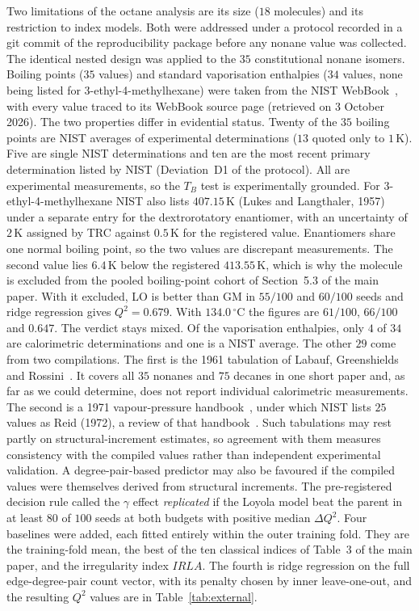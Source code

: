 \documentclass[a5paper, 10pt]{article}
\theoremstyle{plain}
\theoremstyle{remark}
\theoremstyle{definition}
\begin{document}
Two limitations of the octane analysis are its size ($18$ molecules) and
its restriction to index models. Both were addressed under a protocol
recorded in a git commit of the reproducibility package before any
nonane value was collected. The identical nested design was applied to
the $35$ constitutional nonane isomers. Boiling points ($35$ values) and
standard vaporisation enthalpies ($34$ values, none being listed for
3-ethyl-4-methylhexane) were taken from the NIST
WebBook~\cite{NISTWebBook}, with every value traced to its WebBook
source page (retrieved on 3 October 2026). The two properties differ in evidential status. Twenty of
the $35$ boiling points are NIST averages of experimental
determinations ($13$ quoted only to $1$\,K). Five are single NIST
determinations and ten are the most recent primary determination listed
by NIST (Deviation~D1 of the protocol). All are experimental
measurements, so the $T_B$ test is experimentally grounded. For
3-ethyl-4-methylhexane NIST also lists $407.15$\,K (Lukes and Langthaler, 1957) under a separate entry for the dextrorotatory enantiomer, with an uncertainty of $2$\,K assigned by TRC against $0.5$\,K for the registered value. Enantiomers share one normal boiling point, so the two values are discrepant measurements. The second value lies $6.4$\,K below the
registered $413.55$\,K, which is why the molecule is excluded from the
pooled boiling-point cohort of Section~5.3 of the main paper. With it
excluded, LO is better than GM in $55/100$ and $60/100$ seeds and ridge
regression gives $Q^2 = 0.679$. With $134.0\,^{\circ}$C the figures are
$61/100$, $66/100$ and $0.647$. The verdict stays mixed.
Of the vaporisation enthalpies, only $4$ of $34$ are calorimetric
determinations and one is a NIST average. The other $29$ come from two
compilations. The first is the 1961 tabulation of
Labauf, Greenshields and Rossini~\cite{LabaufGreenshieldsRossini1961}.
It covers all $35$ nonanes and $75$ decanes in one short paper and, as far as we could determine, does not report individual calorimetric measurements. The second is a 1971 vapour-pressure handbook~\cite{WilhoitZwolinski1971}, under which NIST lists $25$ values as Reid (1972), a review of that handbook~\cite{Reid1972}. Such tabulations may rest
partly on structural-increment estimates, so agreement with them
measures consistency with the compiled values rather than independent
experimental validation. A degree-pair-based predictor may also be
favoured if the compiled values were themselves derived from structural
increments. The pre-registered
decision rule called the $\gamma$ effect \emph{replicated} if the Loyola
model beat the parent in at least $80$ of $100$ seeds at both budgets
with positive median $\Delta Q^2$. Four baselines were added, each
fitted entirely within the outer training fold. They are the
training-fold mean, the best of the ten classical indices of Table~3 of the main paper, and the irregularity index $IRLA$. The fourth is ridge
regression on the full edge-degree-pair count vector, with its penalty
chosen by inner leave-one-out, and the resulting $Q^2$ values are in
Table~\ref{tab:external}.
\end{document}
